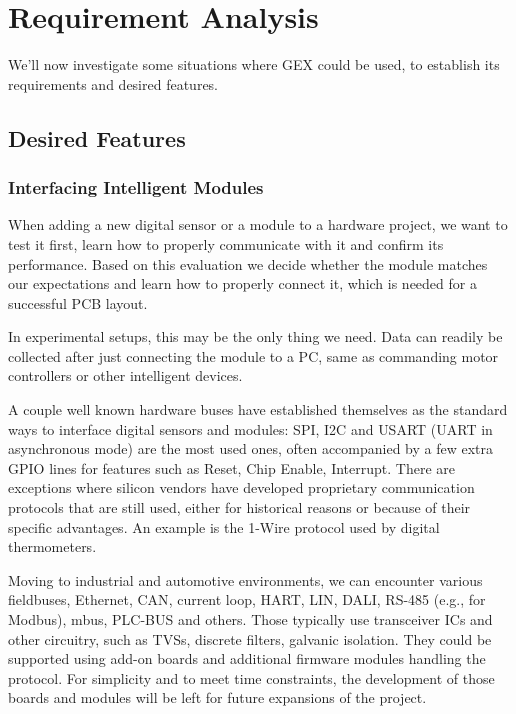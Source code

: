 \chapter{Requirement Analysis}

We'll now investigate some situations where GEX could be used, to establish its requirements and desired features.

\section{Desired Features}

\subsection{Interfacing Intelligent Modules}\label{sec:uses-digital-ifaces}

When adding a new digital sensor or a module to a hardware project, we want to test it first, learn how to properly communicate with it and confirm its performance. Based on this evaluation we decide whether the module matches our expectations and learn how to properly connect it, which is needed for a successful \gls{PCB} layout.

In experimental setups, this may be the only thing we need. Data can readily be collected after just connecting the module to a \gls{PC}, same as commanding motor controllers or other intelligent devices.

A couple well known hardware buses have established themselves as the standard ways to interface digital sensors and modules: \gls{SPI}, \gls{I2C} and \gls{USART} (\gls{UART} in asynchronous mode) are the most used ones, often accompanied by a few extra \gls{GPIO} lines for features such as Reset, Chip Enable, Interrupt. There are exceptions where silicon vendors have developed proprietary communication protocols that are still used, either for historical reasons or because of their specific advantages. An example is the 1-Wire protocol used by digital thermometers.

Moving to industrial and automotive environments, we can encounter various fieldbuses, Ethernet, \gls{CAN}, current loop, \gls{HART}, \gls{LIN}, \gls{DALI}, RS-485 (e.g., for Modbus), \gls{mbus}, PLC-BUS and others. Those typically use transceiver \glspl{IC} and other circuitry, such as \glspl{TVS}, discrete filters, galvanic isolation. They could be supported using add-on boards and additional firmware modules handling the protocol. For simplicity and to meet time constraints, the development of those boards and modules will be left for future expansions of the project.

